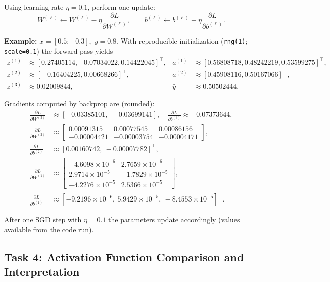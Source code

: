 \documentclass[11pt,a4paper]{article}
\begin{document}
Using learning rate \(\eta = 0.1\), perform one update:
\[
W^{(\ell)} \leftarrow W^{(\ell)} - \eta \frac{\partial L}{\partial W^{(\ell)}},\qquad
b^{(\ell)} \leftarrow b^{(\ell)} - \eta \frac{\partial L}{\partial b^{(\ell)}}.
\]

\textbf{Example:} \(x=[0.5; -0.3],\; y=0.8\). With reproducible initialization
(\texttt{rng(1)}; \texttt{scale=0.1}) the forward pass yields
\[
\begin{aligned}
z^{(1)} &\approx [0.27405114,-0.07034022,0.14422045]^\top, & a^{(1)} &\approx [0.56808718,0.48242219,0.53599275]^\top,\\
z^{(2)} &\approx [-0.16404225,0.00668266]^\top, & a^{(2)} &\approx [0.45908116,0.50167066]^\top,\\
z^{(3)} &\approx 0.02009844, & \hat{y} &\approx 0.50502444.
\end{aligned}
\]

Gradients computed by backprop are (rounded):
\[
\begin{aligned}
\frac{\partial L}{\partial W^{(3)}} &\approx [-0.03385101,\ -0.03699141],\quad
\frac{\partial L}{\partial b^{(3)}} \approx -0.07373644,\\
\frac{\partial L}{\partial W^{(2)}} &\approx
\begin{bmatrix}0.00091315 & 0.00077545 & 0.00086156\\
-0.00004421 & -0.00003754 & -0.00004171\end{bmatrix},\\
\frac{\partial L}{\partial b^{(2)}} &\approx [0.00160742,\ -0.00007782]^\top,\\
\frac{\partial L}{\partial W^{(1)}} &\approx
\begin{bmatrix}-4.6098\times10^{-6} & 2.7659\times10^{-6}\\
2.9714\times10^{-5} & -1.7829\times10^{-5}\\
-4.2276\times10^{-5} & 2.5366\times10^{-5}\end{bmatrix},\\
\frac{\partial L}{\partial b^{(1)}} &\approx [-9.2196\times10^{-6},\ 5.9429\times10^{-5},\ -8.4553\times10^{-5}]^\top.
\end{aligned}
\]

After one SGD step with \(\eta=0.1\) the parameters update accordingly (values
available from the code run).

\subsection{Task 4: Activation Function Comparison and Interpretation}
\end{document}
